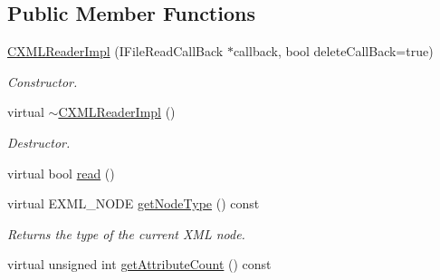 \subsection*{Public Member Functions}
\begin{DoxyCompactItemize}
\item 
\hypertarget{classirr_1_1io_1_1_c_x_m_l_reader_impl_a0566f930b8accdcdd4714f4b850f8a76}{\hyperlink{classirr_1_1io_1_1_c_x_m_l_reader_impl_a0566f930b8accdcdd4714f4b850f8a76}{C\-X\-M\-L\-Reader\-Impl} (I\-File\-Read\-Call\-Back $\ast$callback, bool delete\-Call\-Back=true)}\label{classirr_1_1io_1_1_c_x_m_l_reader_impl_a0566f930b8accdcdd4714f4b850f8a76}

\begin{DoxyCompactList}\small\item\em Constructor. \end{DoxyCompactList}\item 
\hypertarget{classirr_1_1io_1_1_c_x_m_l_reader_impl_a5306b209d836775bc2c5c286314c7e20}{virtual \hyperlink{classirr_1_1io_1_1_c_x_m_l_reader_impl_a5306b209d836775bc2c5c286314c7e20}{$\sim$\-C\-X\-M\-L\-Reader\-Impl} ()}\label{classirr_1_1io_1_1_c_x_m_l_reader_impl_a5306b209d836775bc2c5c286314c7e20}

\begin{DoxyCompactList}\small\item\em Destructor. \end{DoxyCompactList}\item 
virtual bool \hyperlink{classirr_1_1io_1_1_c_x_m_l_reader_impl_abc3c451a40c816ce74c846ebc2e71417}{read} ()
\item 
\hypertarget{classirr_1_1io_1_1_c_x_m_l_reader_impl_a307110843c6946fa862da1f46244aecd}{virtual E\-X\-M\-L\-\_\-\-N\-O\-D\-E \hyperlink{classirr_1_1io_1_1_c_x_m_l_reader_impl_a307110843c6946fa862da1f46244aecd}{get\-Node\-Type} () const }\label{classirr_1_1io_1_1_c_x_m_l_reader_impl_a307110843c6946fa862da1f46244aecd}

\begin{DoxyCompactList}\small\item\em Returns the type of the current X\-M\-L node. \end{DoxyCompactList}\item 
\hypertarget{classirr_1_1io_1_1_c_x_m_l_reader_impl_aec0b88bbe2cbeeb6479a607a1c8590d7}{virtual unsigned int \hyperlink{classirr_1_1io_1_1_c_x_m_l_reader_impl_aec0b88bbe2cbeeb6479a607a1c8590d7}{get\-Attribute\-Count} () const }\label{classirr_1_1io_1_1_c_x_m_l_reader_impl_aec0b88bbe2cbeeb6479a607a1c8590d7}


\end{DoxyCompactItemize}
